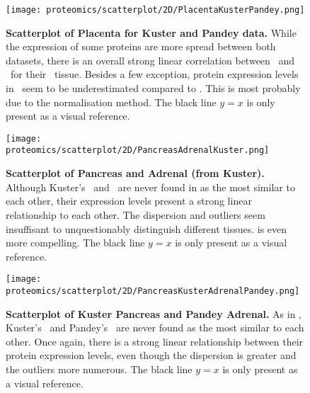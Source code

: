 \begin{figure}[!htpb]
    \texttt{[image: proteomics/scatterplot/2D/PlacentaKusterPandey.png]}\centering
    \caption[Placenta: Kuster vs Pandey]{\label{fig:scat2DPlacentaKusterPandey}\textbf{%
    Scatterplot of Placenta for Kuster and Pandey data.}
    While the expression of some proteins are more spread between both datasets,
    there is an overall strong linear correlation between \pandey\ and \kuster\
    for their \placenta\ tissue.
    Besides a few exception,
    protein expression levels in \pandey\ seem to be underestimated compared to
    \kuster.
    This is most probably due to the normalisation method.
    {\small The black line $y=x$ is only present as a visual reference.}}
\end{figure}

\begin{figure}[!htpb]
    \texttt{[image: proteomics/scatterplot/2D/PancreasAdrenalKuster.png]}\centering
    \caption[Kuster: Pancreas vs Adrenal]{\label{fig:scat2DAdrenalPancreasKuster}\textbf{%
    Scatterplot of Pancreas and Adrenal (from Kuster).}
    Although Kuster's \Pancreas\ and \Adrenal\ are never found
    in 
    as the most similar to each other,
    their expression levels present a strong linear relationship to each other.
    The dispersion and outliers seem insuffisant
    to unquestionably distinguish different tissues.
     is even more compelling.
    {\small The black line $y=x$ is only present as a visual reference.}}
\end{figure}


\begin{figure}[!htpb]
    \texttt{[image: proteomics/scatterplot/2D/PancreasKusterAdrenalPandey.png]}\centering
    \caption[Kuster Pancreas vs Pandey Adrenal]{\label{fig:scat2DAdrenalPandeyPancreasKuster}\textbf{%
    Scatterplot of Kuster Pancreas and Pandey Adrenal.}
    As in ,
    Kuster's \pancreas\ and Pandey's \adrenal\ are never found as the most similar
    to each other.
    Once again,
    there is a strong linear relationship between their protein expression levels,
    even though the dispersion is greater and the outliers more numerous.
    {\small The black line $y=x$ is only present as a visual reference.}}
\end{figure}


